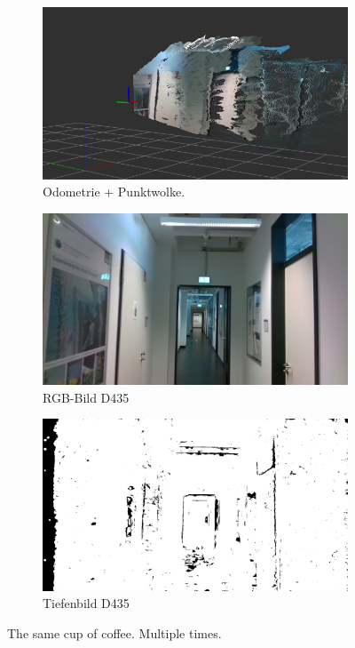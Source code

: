 \begin{figure}[h!]
	\begin{subfigure}[b]{0.31\linewidth}
	\includegraphics[width=\linewidth]{images/dataset/pointcloud1.png}
	\caption{Odometrie + Punktwolke.}
	\end{subfigure}
	\begin{subfigure}[b]{0.31\linewidth}
		\includegraphics[width=\linewidth]{images/dataset/dc_frame000005.png}
		\caption{RGB-Bild D435}
	\end{subfigure}
	\begin{subfigure}[b]{0.31\linewidth}
		\includegraphics[width=\linewidth]{images/dataset/dt_frame000005.png}
		\caption{Tiefenbild D435}
	\end{subfigure}
	\caption{The same cup of coffee. Multiple times.}
	\label{fig:coffee3}
\end{figure}


